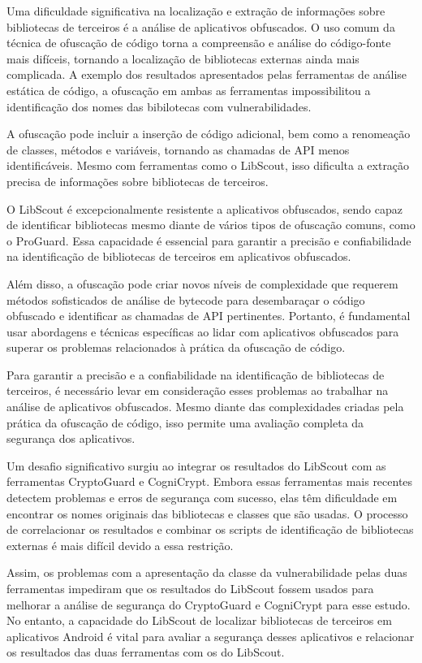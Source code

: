 Uma dificuldade significativa na localização e extração de informações sobre bibliotecas de terceiros é a análise de aplicativos obfuscados. O uso comum da técnica de ofuscação de código torna a compreensão e análise do código-fonte mais difíceis, tornando a localização de bibliotecas externas ainda mais complicada. A exemplo dos resultados apresentados pelas ferramentas de análise estática de código, a ofuscação em ambas as ferramentas impossibilitou a identificação dos nomes das bibilotecas com vulnerabilidades.

A ofuscação pode incluir a inserção de código adicional, bem como a renomeação de classes, métodos e variáveis, tornando as chamadas de API menos identificáveis. Mesmo com ferramentas como o LibScout, isso dificulta a extração precisa de informações sobre bibliotecas de terceiros.

O LibScout é excepcionalmente resistente a aplicativos obfuscados, sendo capaz de identificar bibliotecas mesmo diante de vários tipos de ofuscação comuns, como o ProGuard. Essa capacidade é essencial para garantir a precisão e confiabilidade na identificação de bibliotecas de terceiros em aplicativos obfuscados.

Além disso, a ofuscação pode criar novos níveis de complexidade que requerem métodos sofisticados de análise de bytecode para desembaraçar o código obfuscado e identificar as chamadas de API pertinentes. Portanto, é fundamental usar abordagens e técnicas específicas ao lidar com aplicativos obfuscados para superar os problemas relacionados à prática da ofuscação de código.

Para garantir a precisão e a confiabilidade na identificação de bibliotecas de terceiros, é necessário levar em consideração esses problemas ao trabalhar na análise de aplicativos obfuscados. Mesmo diante das complexidades criadas pela prática da ofuscação de código, isso permite uma avaliação completa da segurança dos aplicativos.

Um desafio significativo surgiu ao integrar os resultados do LibScout com as ferramentas CryptoGuard e CogniCrypt. Embora essas ferramentas mais recentes detectem problemas e erros de segurança com sucesso, elas têm dificuldade em encontrar os nomes originais das bibliotecas e classes que são usadas. O processo de correlacionar os resultados e combinar os scripts de identificação de bibliotecas externas é mais difícil devido a essa restrição.

Assim, os problemas com a apresentação da classe da vulnerabilidade pelas duas ferramentas impediram que os resultados do LibScout fossem usados para melhorar a análise de segurança do CryptoGuard e CogniCrypt para esse estudo. No entanto, a capacidade do LibScout de localizar bibliotecas de terceiros em aplicativos Android é vital para avaliar a segurança desses aplicativos e relacionar os resultados das duas ferramentas com os do LibScout.


